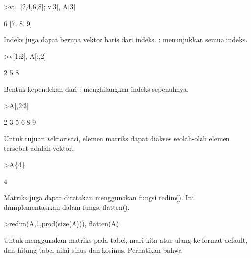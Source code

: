 \documentclass[a4paper,10pt]{article}
\begin{document}
\begin{eulernotebook}
\begin{eulercomment}
\begin{eulercomment}
\begin{eulercomment}
\begin{eulercomment}
\begin{eulercomment}
\begin{eulercomment}
\begin{eulercomment}
\end{eulercomment}
\begin{eulerprompt}
>v:=[2,4,6,8]; v[3], A[3]
\end{eulerprompt}
\begin{euleroutput}
  6
  [7,  8,  9]
\end{euleroutput}
\begin{eulercomment}
Indeks juga dapat berupa vektor baris dari indeks. : menunjukkan semua
indeks.
\end{eulercomment}
\begin{eulerprompt}
>v[1:2], A[:,2]
\end{eulerprompt}
\begin{euleroutput}
  [2,  4]
              2 
              5 
              8 
\end{euleroutput}
\begin{eulercomment}
Bentuk kependekan dari : menghilangkan indeks sepenuhnya.
\end{eulercomment}
\begin{eulerprompt}
>A[,2:3]
\end{eulerprompt}
\begin{euleroutput}
              2             3 
              5             6 
              8             9 
\end{euleroutput}
\begin{eulercomment}
Untuk tujuan vektorisasi, elemen matriks dapat diakses seolah-olah
elemen tersebut adalah vektor.
\end{eulercomment}
\begin{eulerprompt}
>A\{4\}
\end{eulerprompt}
\begin{euleroutput}
  4
\end{euleroutput}
\begin{eulercomment}
Matriks juga dapat diratakan menggunakan fungsi redim(). Ini
diimplementasikan dalam fungsi flatten().
\end{eulercomment}
\begin{eulerprompt}
>redim(A,1,prod(size(A))), flatten(A)
\end{eulerprompt}
\begin{euleroutput}
  [1,  2,  3,  4,  5,  6,  7,  8,  9]
  [1,  2,  3,  4,  5,  6,  7,  8,  9]
\end{euleroutput}
\begin{eulercomment}
Untuk menggunakan matriks pada tabel, mari kita atur ulang ke format
default, dan hitung tabel nilai sinus dan kosinus. Perhatikan bahwa

\end{eulercomment}
\end{eulercomment}
\end{eulercomment}
\end{eulercomment}
\end{eulercomment}
\end{eulercomment}
\end{eulercomment}
\end{eulernotebook}
\end{document}
